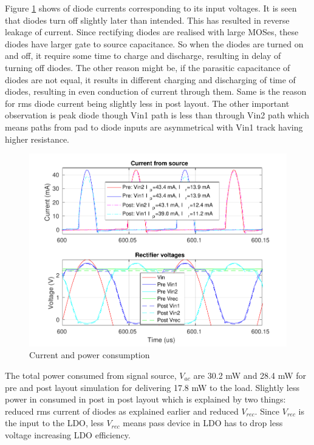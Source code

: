 \documentclass[12pt,a4paper,UKenglish]{report}
\begin{document}
Figure \ref{fig:pms_PI} shows of diode currents corresponding to its input voltages. It is seen that diodes turn off slightly later than intended. This has resulted in reverse leakage of current. Since rectifying  diodes are realised with large MOSes, these diodes have larger gate to source capacitance. So when the diodes are turned on and off, it require some time to charge and discharge, resulting in delay of turning off diodes. The other reason might be,  if the parasitic capacitance of diodes are not equal, it results in different charging and discharging of time of diodes, resulting in even conduction of current through them.
Same is the reason for rms diode current being slightly less in post layout. The other important observation is peak diode though Vin1 path is 
less than through Vin2 path which means paths from pad to diode inputs are asymmetrical with Vin1 track having higher resistance.\\


\begin{figure} [H]
  \centering
  \includegraphics[width=\textwidth]{img/pms/pms2_VIrect_both.pdf} 
 \caption{Current and power consumption} 
\label{fig:pms_PI}  
\end{figure}

The total power consumed from signal source, $V_{ac}$ are 30.2 mW and 28.4 mW for pre and post layout simulation for delivering 17.8 mW to 
the load. Slightly less power in consumed in post in post layout which  is explained by two things: reduced rms current of 
diodes as explained earlier and reduced $V_{rec}$. Since $V_{rec}$ is the input to the LDO, less $V_{rec}$ means pass device in LDO has 
to drop less voltage increasing LDO efficiency.
\end{document}
